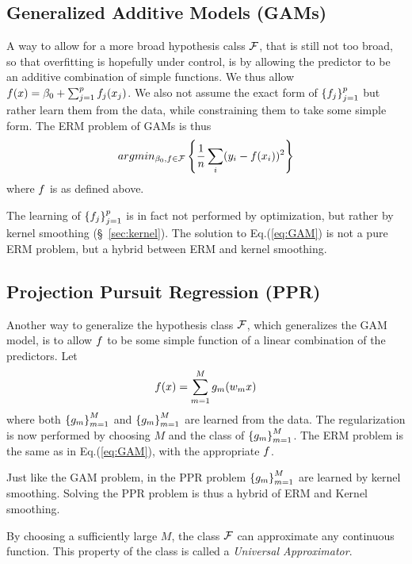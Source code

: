 \subsection{Generalized Additive Models (GAMs)}
\label{sec:gam}
A way to allow for a more broad hypothesis calss $\mathcal{F}$, that is still not too broad, so that overfitting is hopefully under control, is by allowing the predictor to be an additive combination of simple functions.
We thus allow $f(x)=\beta_0 + \sum_{j=1}^p f_j(x_j)$. We also not assume the exact form of $\left\{ f_j \right\}_{j=1}^p$ but rather learn them from the data, while constraining them to take some simple form.
The ERM problem of GAMs is thus
\begin{align}
\label{eq:GAM}
	 argmin_{\beta_0,f \in \mathcal{F}}\left\{ \frac{1}{n}\sum_i (y_i-f(x_i))^2   \right\}
\end{align}
where $f$ is as defined above.

\begin{remark}
The learning of $\left\{ f_j \right\}_{j=1}^p$ is in fact not performed by optimization, but rather by kernel smoothing (\S~\ref{sec:kernel}).
The solution to Eq.(\ref{eq:GAM}) is not a pure ERM problem, but a hybrid between ERM and kernel smoothing.
\end{remark}



\subsection{Projection Pursuit Regression (PPR)}
\label{sec:ppr}
Another way to generalize the hypothesis class $\mathcal{F}$, which generalizes the GAM model, is to allow $f$ to be some simple function of a linear combination of the predictors. Let 
\begin{align}
\label{eq:PPR}
	f(x)=\sum_{m=1}^M g_m(w_m x)
\end{align}
where both $\left\{ g_m \right\}_{m=1}^M$ and $\left\{ g_m \right\}_{m=1}^M$ are learned from the data. 
The regularization is now performed by choosing $M$ and the class of $\left\{ g_m \right\}_{m=1}^M$.
The ERM problem is the same as in Eq.(\ref{eq:GAM}), with the appropriate $f$.

\begin{remark}
Just like the GAM problem, in the PPR problem $\left\{ g_m \right\}_{m=1}^M$ are learned by kernel smoothing. Solving the PPR problem is thus a hybrid of ERM and Kernel smoothing. 
\end{remark}

\begin{remark}
By choosing a sufficiently large $M$, the class $\mathcal{F}$ can approximate any continuous function. This property of the class is called a \emph{Universal Approximator}.
\end{remark}




